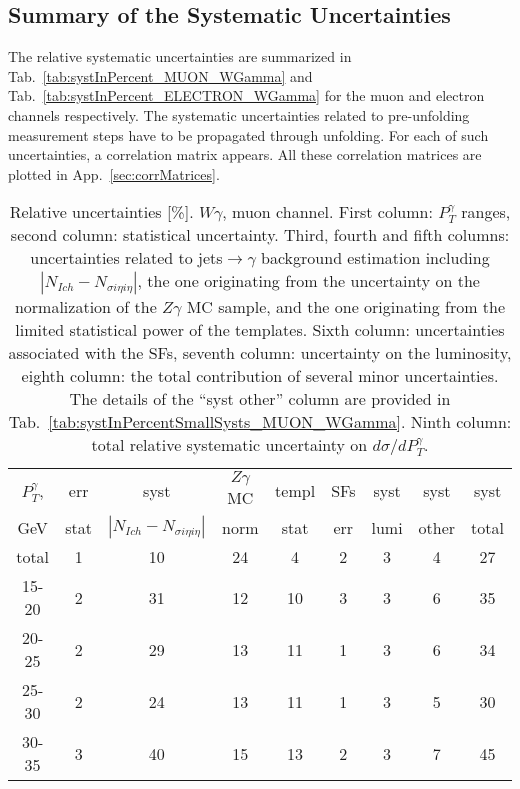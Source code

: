 \subsection{Summary of the Systematic Uncertainties}

The relative systematic uncertainties are summarized in Tab.~\ref{tab:systInPercent_MUON_WGamma} and Tab.~\ref{tab:systInPercent_ELECTRON_WGamma} for the muon and electron channels respectively. The systematic uncertainties related to pre-unfolding measurement steps have to be propagated through unfolding. For each of such uncertainties, a correlation matrix appears. All these correlation matrices are plotted in App.~\ref{sec:corrMatrices}.

\begin{table}[h]
  \scriptsize
  \begin{center}
  \caption{Relative uncertainties [\%]. $W\gamma$, muon channel. First column: $P_T^{\gamma}$ ranges, second column: statistical uncertainty. Third, fourth and fifth columns: uncertainties related to jets$\rightarrow\gamma$ background estimation including $|N_{Ich}-N_{\sigma i\eta i\eta}|$, the one originating from the uncertainty on the normalization of the $Z\gamma$ MC sample, and the one originating from the limited statistical power of the templates. Sixth column: uncertainties associated with the SFs, seventh column: uncertainty on the luminosity, eighth column: the total contribution of several minor uncertainties. The details of the ``syst other'' column are provided in Tab.~\ref{tab:systInPercentSmallSysts_MUON_WGamma}. Ninth column: total relative systematic uncertainty on $d\sigma/dP_T^{\gamma}$.}
   \begin{tabular}{|c|c|c|c|c|c|c|c|c|}
    $P_T^{\gamma}$,  & err & syst                          & $Z\gamma$ MC & templ & SFs & syst & syst & syst\\
    GeV           & stat & $|N_{Ich}-N_{\sigma{i\eta i\eta}}|$ & norm         & stat  & err & lumi & other & total\\ \hline
    total  & 1 & 10 & 24 & 4 & 2 & 3 & 4 & 27 \\ \hline
    15-20 & 2 & 31 & 12 & 10 & 3 & 3 & 6 & 35 \\ \hline
    20-25 & 2 & 29 & 13 & 11 & 1 & 3 & 6 & 34 \\ \hline
    25-30 & 2 & 24 & 13 & 11 & 1 & 3 & 5 & 30 \\ \hline
    30-35 & 3 & 40 & 15 & 13 & 2 & 3 & 7 & 45 \\ \hline

\end{tabular}
\end{center}
\end{table}
